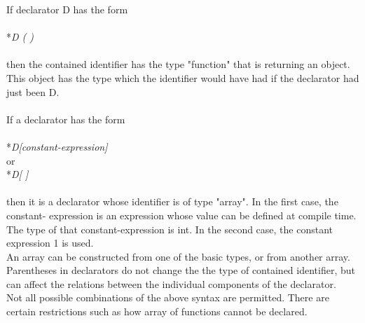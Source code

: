If declarator D has the form\\
		\\*\indent\indent\textit{D ( )}\\\\
then the contained identifier has the type "function" that is returning an object. This object has the type which the identifier would have had if the declarator had just been D.\\\\
If a declarator has the form\\
		\\*\indent\indent\textit{D[constant-expression]}\\
or
		\\*\indent\indent\textit{D[ ]}\\\\
then it is a declarator whose identifier is of type "array". In the first case, the constant- expression is an expression whose value can be defined at compile time.  The type of that constant-expression is int. In the second case, the constant expression 1 is used. \\

An array can be constructed from one of the basic types, or from another array.\\

Parentheses in declarators do not change the the type of contained identifier, but can affect the relations between the individual components of the declarator.\\

Not all possible combinations of the above syntax are permitted. There are certain restrictions such as how array of functions cannot be declared.
